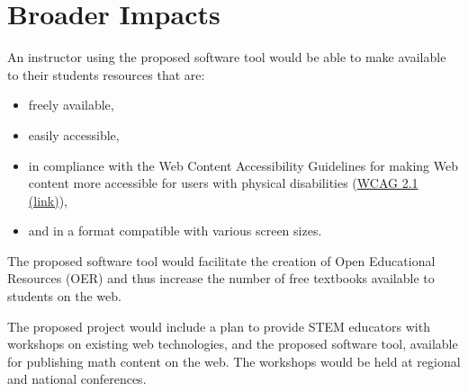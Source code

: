 \documentclass[12pt]{article}
\begin{document}
\section{Broader Impacts}
An instructor using the proposed software tool would be able to make available to their students resources that are:
\begin{itemize}
\item freely available,
\item easily accessible,
\item in compliance with the Web Content Accessibility Guidelines for making Web content more accessible for users with physical disabilities (\href{https://www.w3.org/TR/WCAG21/}{WCAG 2.1 (link)}),
\item and in a format compatible with various screen sizes.
\end{itemize}
The proposed software tool would facilitate the creation of Open Educational Resources (OER) and thus increase the number of free textbooks available to students on the web.

The proposed project would include a plan to provide STEM educators with workshops on existing web technologies, and the proposed software tool, available for publishing math content on the web.  The workshops would be held at regional and national conferences.
\end{document}
